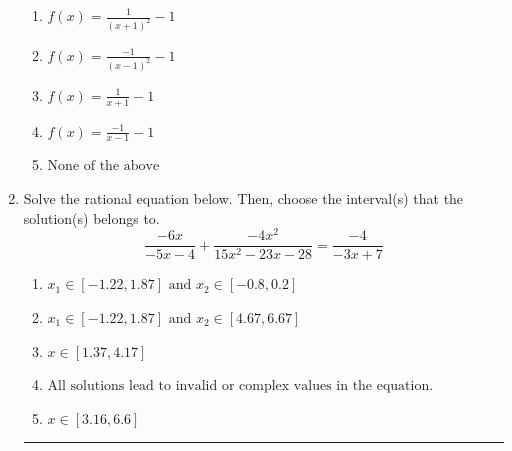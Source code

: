 \documentclass[14pt]{extbook}
\newcommand{\litem}[1]{\item#1\hspace*{-1cm}\rule{\textwidth}{0.4pt}}
\begin{document}
\begin{enumerate}
{\begin{center}
\end{center}
\begin{enumerate}[label=\Alph*.]
\item \( f(x) = \frac{1}{(x + 1)^2} - 1 \)
\item \( f(x) = \frac{-1}{(x - 1)^2} - 1 \)
\item \( f(x) = \frac{1}{x + 1} - 1 \)
\item \( f(x) = \frac{-1}{x - 1} - 1 \)
\item \( \text{None of the above} \)

\end{enumerate} }
\litem{
Solve the rational equation below. Then, choose the interval(s) that the solution(s) belongs to.\[ \frac{-6x}{-5x -4} + \frac{-4x^{2}}{15x^{2} -23 x -28} = \frac{-4}{-3x + 7} \]\begin{enumerate}[label=\Alph*.]
\item \( x_1 \in [-1.22, 1.87] \text{ and } x_2 \in [-0.8,0.2] \)
\item \( x_1 \in [-1.22, 1.87] \text{ and } x_2 \in [4.67,6.67] \)
\item \( x \in [1.37,4.17] \)
\item \( \text{All solutions lead to invalid or complex values in the equation.} \)
\item \( x \in [3.16,6.6] \)

\end{enumerate} }
\end{enumerate}
\end{document}
